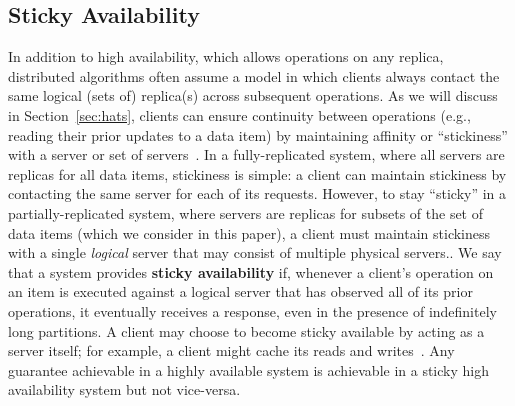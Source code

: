 \subsection{Sticky Availability}
\label{sec:sticky}

In addition to high availability, which allows operations on any
replica, distributed algorithms often assume a model in which clients
always contact the same logical (sets of) replica(s) across subsequent
operations. As we will discuss in Section~\ref{sec:hats}, clients can
ensure continuity between operations (e.g., reading their prior
updates to a data item) by maintaining affinity or ``stickiness'' with
a server or set of servers~\cite{vogels-defs}. In a fully-replicated
system, where all servers are replicas for all data items, stickiness
is simple: a client can maintain stickiness by contacting the same
server for each of its requests. However, to stay ``sticky'' in a
partially-replicated system, where servers are replicas for subsets of
the set of data items (which we consider in this paper), a client must
maintain stickiness with a single \textit{logical} server that may
consist of multiple physical servers.. We say that a system provides
\textbf{sticky availability} if, whenever a client's operation on an
item is executed against a logical server that has observed all of its
prior operations, it eventually receives a response, even in the
presence of indefinitely long partitions. A client may choose to
become sticky available by acting as a server itself; for example, a
client might cache its reads and writes~\cite{bolton,
  sessionguarantees, swift}. Any guarantee achievable in a highly
available system is achievable in a sticky high availability system
but not vice-versa.


